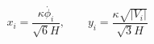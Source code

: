 \begin{equation}
x_i=\frac{\kappa \dot{\phi _i}}{\sqrt{6}H}, \qquad
y_i=\frac{\kappa \sqrt{|V_i|}}{\sqrt{3}H}
\end{equation}

